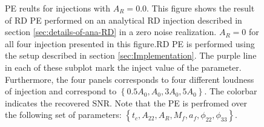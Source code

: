 \begin{figure}
\caption{PE reults for injections with $A_{R} = 0.0$. This figure shows the result of RD PE performed on an analytical RD injection described in section \ref{sec:details-of-ana-RD} in a zero noise realization. $A_{R} =0$ for all four injection presented in this figure.RD PE is performed using the setup described in section \ref{sec:Implementation}. The purple line in each of these subplot mark the inject value of the parameter. Furthermore, the four panels corresponds to four different loudness of injection and correspond to $\left\lbrace 0.5 A_{0}, A_{0}, 3A_{0}, 5A_{0}\right\rbrace $. The colorbar indicates the recovered SNR. Note that the PE is perfromed over the following set of parameters:  $\left\lbrace  t_{c}, A_{22}, A_{R}, M_{f}, a_{f}, \phi_{22}, \phi_{33 } \right\rbrace $. }  
\label{fig:zero}

\end{figure}

